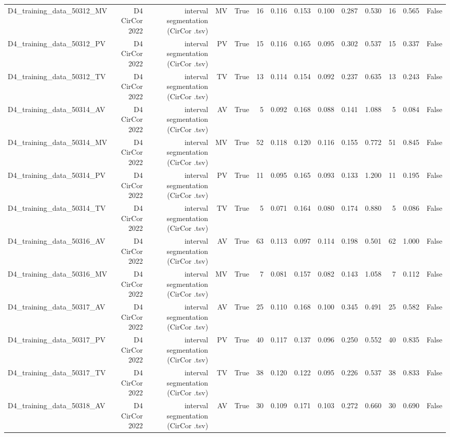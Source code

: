 \begin{table}[htbp]
\begin{tabular}{lrrrrrrrrrrrrr}
    D4\_training\_data\_50312\_MV & D4 CirCor 2022 & interval segmentation (CirCor .tsv) & MV & True & 16 & 0.116 & 0.153 & 0.100 & 0.287 & 0.530 & 16 & 0.565 & False \\
    D4\_training\_data\_50312\_PV & D4 CirCor 2022 & interval segmentation (CirCor .tsv) & PV & True & 15 & 0.116 & 0.165 & 0.095 & 0.302 & 0.537 & 15 & 0.337 & False \\
    D4\_training\_data\_50312\_TV & D4 CirCor 2022 & interval segmentation (CirCor .tsv) & TV & True & 13 & 0.114 & 0.154 & 0.092 & 0.237 & 0.635 & 13 & 0.243 & False \\
    D4\_training\_data\_50314\_AV & D4 CirCor 2022 & interval segmentation (CirCor .tsv) & AV & True & 5 & 0.092 & 0.168 & 0.088 & 0.141 & 1.088 & 5 & 0.084 & False \\
    D4\_training\_data\_50314\_MV & D4 CirCor 2022 & interval segmentation (CirCor .tsv) & MV & True & 52 & 0.118 & 0.120 & 0.116 & 0.155 & 0.772 & 51 & 0.845 & False \\
    D4\_training\_data\_50314\_PV & D4 CirCor 2022 & interval segmentation (CirCor .tsv) & PV & True & 11 & 0.095 & 0.165 & 0.093 & 0.133 & 1.200 & 11 & 0.195 & False \\
    D4\_training\_data\_50314\_TV & D4 CirCor 2022 & interval segmentation (CirCor .tsv) & TV & True & 5 & 0.071 & 0.164 & 0.080 & 0.174 & 0.880 & 5 & 0.086 & False \\
    D4\_training\_data\_50316\_AV & D4 CirCor 2022 & interval segmentation (CirCor .tsv) & AV & True & 63 & 0.113 & 0.097 & 0.114 & 0.198 & 0.501 & 62 & 1.000 & False \\
    D4\_training\_data\_50316\_MV & D4 CirCor 2022 & interval segmentation (CirCor .tsv) & MV & True & 7 & 0.081 & 0.157 & 0.082 & 0.143 & 1.058 & 7 & 0.112 & False \\
    D4\_training\_data\_50317\_AV & D4 CirCor 2022 & interval segmentation (CirCor .tsv) & AV & True & 25 & 0.110 & 0.168 & 0.100 & 0.345 & 0.491 & 25 & 0.582 & False \\
    D4\_training\_data\_50317\_PV & D4 CirCor 2022 & interval segmentation (CirCor .tsv) & PV & True & 40 & 0.117 & 0.137 & 0.096 & 0.250 & 0.552 & 40 & 0.835 & False \\
    D4\_training\_data\_50317\_TV & D4 CirCor 2022 & interval segmentation (CirCor .tsv) & TV & True & 38 & 0.120 & 0.122 & 0.095 & 0.226 & 0.537 & 38 & 0.833 & False \\
    D4\_training\_data\_50318\_AV & D4 CirCor 2022 & interval segmentation (CirCor .tsv) & AV & True & 30 & 0.109 & 0.171 & 0.103 & 0.272 & 0.660 & 30 & 0.690 & False \\

\end{tabular}
\end{table}
